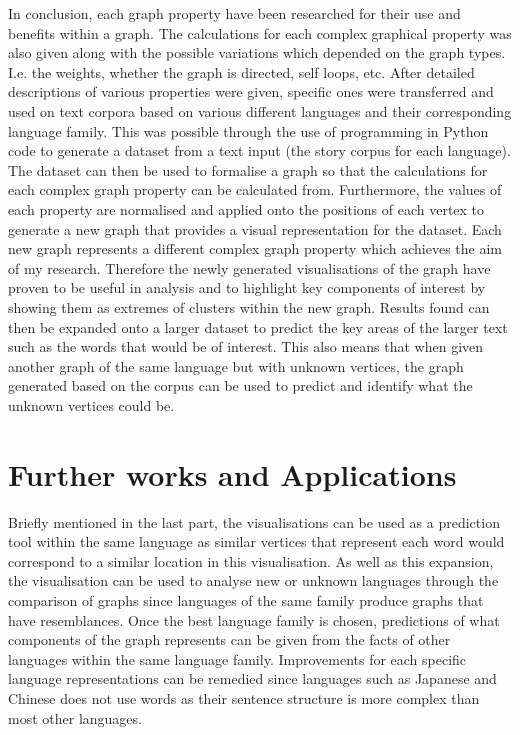 \noindent In conclusion, each graph property have been researched for their use and benefits within a graph. The calculations for each complex graphical property was also given along with the possible variations which depended on the graph types. I.e. the weights, whether the graph is directed, self loops, etc. After detailed descriptions of various properties were given, specific ones were transferred and used on text corpora based on various different languages and their corresponding language family. This was possible through the use of programming in Python code to generate a dataset from a text input (the story corpus for each language). The dataset can then be used to formalise a graph so that the calculations for each complex graph property can be calculated from. Furthermore, the values of each property are normalised and applied onto the positions of each vertex to generate a new graph that provides a visual representation for the dataset. Each new graph represents a different complex graph property which achieves the aim of my research. Therefore the newly generated visualisations of the graph have proven to be useful in analysis and to highlight key components of interest by showing them as extremes of clusters within the new graph. Results found can then be expanded onto a larger dataset to predict the key areas of the larger text such as the words that would be of interest. This also means that when given another graph of the same language but with unknown vertices, the graph generated based on the corpus can be used to predict and identify what the unknown vertices could be. 

\section{Further works and Applications}
Briefly mentioned in the last part, the visualisations can be used as a prediction tool within the same language as similar vertices that represent each word would correspond to a similar location in this visualisation. As well as this expansion, the visualisation can be used to analyse new or unknown languages through the comparison of graphs since languages of the same family produce graphs that have resemblances. Once the best language family is chosen, predictions of what components of the graph represents can be given from the facts of other languages within the same language family. Improvements for each specific language representations can be remedied since languages such as Japanese and Chinese does not use words as their sentence structure is more complex than most other languages.

